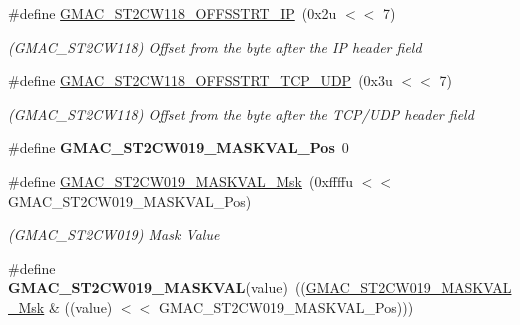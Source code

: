 \begin{DoxyCompactItemize}
\mbox{\label{group__SAMV71__GMAC_ga97f5729d8dd79af7488af2e068e5366d}} 
\#define \mbox{\hyperlink{group__SAMV71__GMAC_ga97f5729d8dd79af7488af2e068e5366d}{G\+M\+A\+C\+\_\+\+S\+T2\+C\+W118\+\_\+\+O\+F\+F\+S\+S\+T\+R\+T\+\_\+\+IP}}~(0x2u $<$$<$ 7)
\begin{DoxyCompactList}\small\item\em (G\+M\+A\+C\+\_\+\+S\+T2\+C\+W118) Offset from the byte after the IP header field \end{DoxyCompactList}\item 
\mbox{\label{group__SAMV71__GMAC_gada9cf902a1e0656a056e8ddd1f6af314}} 
\#define \mbox{\hyperlink{group__SAMV71__GMAC_gada9cf902a1e0656a056e8ddd1f6af314}{G\+M\+A\+C\+\_\+\+S\+T2\+C\+W118\+\_\+\+O\+F\+F\+S\+S\+T\+R\+T\+\_\+\+T\+C\+P\+\_\+\+U\+DP}}~(0x3u $<$$<$ 7)
\begin{DoxyCompactList}\small\item\em (G\+M\+A\+C\+\_\+\+S\+T2\+C\+W118) Offset from the byte after the T\+C\+P/\+U\+DP header field \end{DoxyCompactList}\item 
\mbox{\label{group__SAMV71__GMAC_ga80069e13fd930907c825e6ad16cc4712}} 
\#define {\bfseries G\+M\+A\+C\+\_\+\+S\+T2\+C\+W019\+\_\+\+M\+A\+S\+K\+V\+A\+L\+\_\+\+Pos}~0
\item 
\mbox{\label{group__SAMV71__GMAC_ga0c587d8cd5520758432feb65f7153368}} 
\#define \mbox{\hyperlink{group__SAMV71__GMAC_ga0c587d8cd5520758432feb65f7153368}{G\+M\+A\+C\+\_\+\+S\+T2\+C\+W019\+\_\+\+M\+A\+S\+K\+V\+A\+L\+\_\+\+Msk}}~(0xffffu $<$$<$ G\+M\+A\+C\+\_\+\+S\+T2\+C\+W019\+\_\+\+M\+A\+S\+K\+V\+A\+L\+\_\+\+Pos)
\begin{DoxyCompactList}\small\item\em (G\+M\+A\+C\+\_\+\+S\+T2\+C\+W019) Mask Value \end{DoxyCompactList}\item 
\mbox{\label{group__SAMV71__GMAC_ga9e7edb2225dccfef475c35acd255ffaa}} 
\#define {\bfseries G\+M\+A\+C\+\_\+\+S\+T2\+C\+W019\+\_\+\+M\+A\+S\+K\+V\+AL}(value)~((\mbox{\hyperlink{group__SAMV71__GMAC_ga0c587d8cd5520758432feb65f7153368}{G\+M\+A\+C\+\_\+\+S\+T2\+C\+W019\+\_\+\+M\+A\+S\+K\+V\+A\+L\+\_\+\+Msk}} \& ((value) $<$$<$ G\+M\+A\+C\+\_\+\+S\+T2\+C\+W019\+\_\+\+M\+A\+S\+K\+V\+A\+L\+\_\+\+Pos)))

\end{DoxyCompactItemize}
